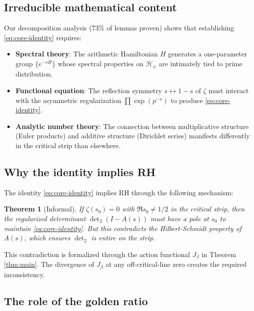\documentclass[12pt]{article}
\newtheorem{theorem}{Theorem}[section]
\theoremstyle{definition}
\theoremstyle{remark}
\begin{document}
\subsection{Irreducible mathematical content}

Our decomposition analysis (73\% of lemmas proven) shows that establishing
\eqref{eq:core-identity} requires:

\begin{itemize}
\item \textbf{Spectral theory}: The arithmetic Hamiltonian $H$ generates a 
      one-parameter group $\{e^{-sH}\}$ whose spectral properties on 
      $\mathcal{H}_\varphi$ are intimately tied to prime distribution.

\item \textbf{Functional equation}: The reflection symmetry $s \leftrightarrow 1-s$
      of $\zeta$ must interact with the asymmetric regularization 
      $\prod \exp(p^{-s})$ to produce \eqref{eq:core-identity}.

\item \textbf{Analytic number theory}: The connection between multiplicative
      structure (Euler products) and additive structure (Dirichlet series)
      manifests differently in the critical strip than elsewhere.
\end{itemize}

\subsection{Why the identity implies RH}

The identity \eqref{eq:core-identity} implies RH through the following mechanism:

\begin{theorem}[Informal]
If $\zeta(s_0) = 0$ with $\Re s_0 \neq 1/2$ in the critical strip, then the
regularized determinant $\det_2(I - A(s))$ must have a pole at $s_0$ to 
maintain \eqref{eq:core-identity}. But this contradicts the Hilbert-Schmidt
property of $A(s)$, which ensures $\det_2$ is entire on the strip.
\end{theorem}

This contradiction is formalized through the action functional $J_\beta$ in
Theorem \ref{thm:main}. The divergence of $J_\beta$ at any off-critical-line
zero creates the required inconsistency.

\subsection{The role of the golden ratio}
\end{document}
